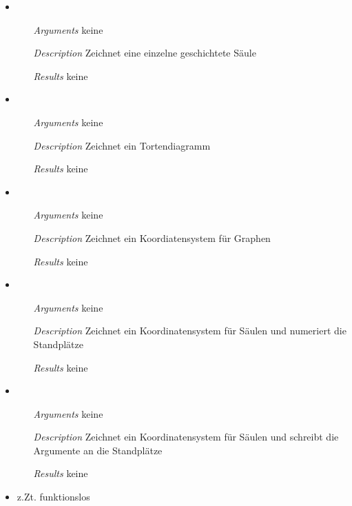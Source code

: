 \begin{itemize}
\item {}
\begin{enumerate}
\item[\textit{Arguments}] keine
\item[\textit{Description}] Zeichnet eine einzelne geschichtete
  S\"aule
\item[\textit{Results}] keine
\end{enumerate}

\item {}
\begin{enumerate}
\item[\textit{Arguments}] keine
\item[\textit{Description}] Zeichnet ein Tortendiagramm
\item[\textit{Results}] keine
\end{enumerate}

\item {}
\begin{enumerate}
\item[\textit{Arguments}] keine
\item[\textit{Description}] Zeichnet ein Koordiatensystem f\"ur
  Graphen
\item[\textit{Results}] keine
\end{enumerate}

\item {}
\begin{enumerate}
\item[\textit{Arguments}] keine
\item[\textit{Description}] Zeichnet ein Koordinatensystem f\"ur
  S\"aulen und numeriert die Standpl\"atze
\item[\textit{Results}] keine
\end{enumerate}

\item {}
\begin{enumerate}
\item[\textit{Arguments}] keine
\item[\textit{Description}] Zeichnet ein Koordinatensystem f\"ur
  S\"aulen und schreibt die Argumente an die Standpl\"atze
\item[\textit{Results}] keine
\end{enumerate}

\item {} z.Zt. funktionslos

\end{itemize}

